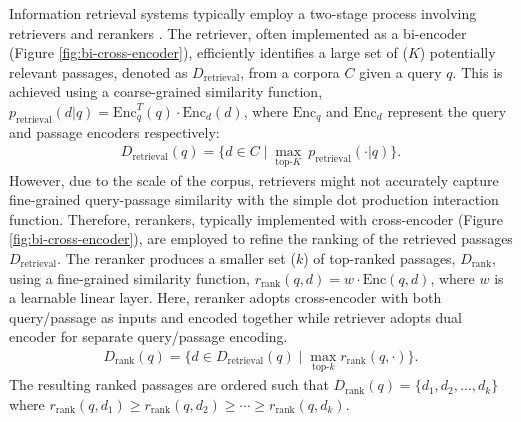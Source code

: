 Information retrieval systems \citep{zhu2023large} typically employ a two-stage process involving retrievers \citep{zhao2024dense} and rerankers \citep{lin2022pretrained}.
The retriever, often implemented as a bi-encoder (Figure \ref{fig:bi-cross-encoder}), efficiently identifies a large set of ($K$) potentially relevant passages, denoted as $D_{\text{retrieval}}$, from a corpora $C$ given a query $q$.
This is achieved using a coarse-grained similarity function, $p_{\text{retrieval}}(d|q)=\text{Enc}^T_q(q) \cdot \text{Enc}_d(d)$, where $\text{Enc}_q$ and $\text{Enc}_d$ represent the query and passage encoders respectively:
\begin{gather}\label{eq:retriever}
    D_{\text{retrieval}}(q) = \{ d \in C \;|\; \max_{\text{top-}K} ~ p_{\text{retrieval}}(\cdot | q)\}.
\end{gather}
However, due to the scale of the corpus, retrievers might not accurately capture fine-grained query-passage similarity with the simple dot production interaction function. 
Therefore, rerankers, typically implemented with cross-encoder (Figure \ref{fig:bi-cross-encoder}), are employed to refine the ranking of the retrieved passages $D_{\text{retrieval}}$.
The reranker produces a smaller set ($k$) of top-ranked passages, $D_\text{rank}$, using a fine-grained similarity function, $r_{\text{rank}}(q,d)=w \cdot \text{Enc}(q, d)$, where $w$ is a learnable linear layer. 
Here, reranker adopts cross-encoder with both query/passage as inputs and encoded together while retriever adopts dual encoder for separate query/passage encoding.
\begin{gather}\label{eq:reranker}
    D_{\text{rank}}(q) = \{ d \in D_{\text{retrieval}}(q) \;|\; \max_{\text{top-}k} r_{\text{rank}}(q, \cdot)\}.
\end{gather}
The resulting ranked passages are ordered such that $D_{\text{rank}}(q)=\{d_1, d_2, \ldots, d_k\}$ where $r_{\text{rank}}(q, d_1)\ge r_{\text{rank}}(q, d_2)\ge\cdots\ge r_{\text{rank}}(q, d_k)$.

